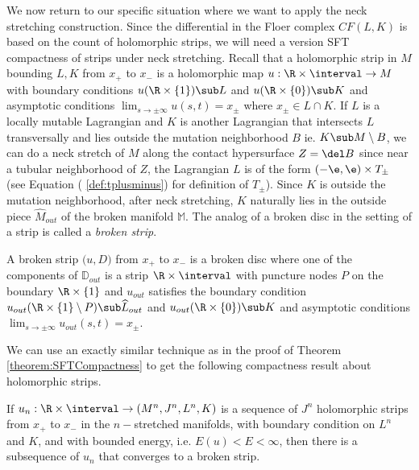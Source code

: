 We now return to our specific situation where we want to apply the neck stretching construction. Since the differential in the Floer complex $CF(L,K)$ is based on the count of  holomorphic strips, we will need a version  SFT compactness of strips under neck stretching.  Recall that a holomorphic strip in $M$ bounding $L,K$ from $x_+$ to $x_-$ is a holomorphic map $u : \R \times \interval \to M$ with boundary conditions $u(\R \times \{1\}) \sub L$ and $u(\R \times \{ 0\}) \sub K$ and asymptotic conditions $\lim_{s\to \pm \infty} u(s,t) = x_\pm $ where $x_\pm \in L \cap K$.  If $L$ is a locally mutable Lagrangian and $K$ is another Lagrangian that intersects $L$ transversally and lies outside the mutation neighborhood $B$  ie. $K \sub M \setminus B$, we can do a neck stretch of $M$ along the contact hypersurface $Z= \del B$ since near a tubular neighborhood of $Z$, the Lagrangian $L$ is of the form $(-\e ,\e) \times T_\pm$ (see Equation ( \ref{def:tplusminus}) for definition of $T_\pm$). Since $K$ is outside the mutation neighborhood, after neck stretching, $K$ naturally lies in the outside piece $\widehat{M}_{out}$ of the broken manifold $\mathbb{M}$. The analog of a broken disc in the setting of a strip is called a \textit{broken strip}. 

\begin{defn}
A broken strip $\mathfrak({u,D})$ from $x_+$ to $x_-$ is a broken disc where one of the components of $\mathbb{D}_{out}$ is a strip $\R \times \interval$ with puncture nodes $P$ on the boundary $\R \times \{1\}$ and $u_{out}$ satisfies the boundary condition $u_{out}(\R \times \{1\} \setminus P) \sub \widehat{L}_{out}$ and $u_{out}(\R \times \{0\}) \sub K$ and asymptotic conditions $\lim_{s\to \pm \infty}u_{out}(s,t) = x_\pm$.
\end{defn}

We can use an exactly similar technique as in the proof of Theorem \ref{theorem:SFTCompactness} to get the following compactness result about holomorphic strips. 
\begin{Theorem}
If $u_n : \R \times \interval \to (M^n,J^n,L^n,K) $ is a sequence of $J^n$ holomorphic strips from $x_+$ to $x_-$ in the $n-$stretched manifolds, with boundary condition on $L^n$ and $K$, and with bounded energy, i.e. $E(u) < E< \infty$, then there is a subsequence of $u_n$ that converges to a broken strip.
\end{Theorem}







